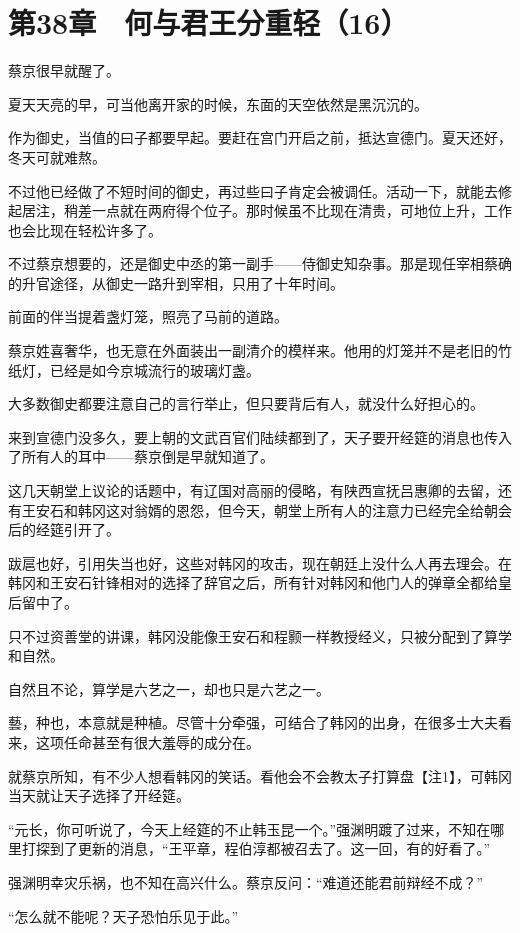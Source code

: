 \section{第38章　何与君王分重轻（16）}

蔡京很早就醒了。

夏天天亮的早，可当他离开家的时候，东面的天空依然是黑沉沉的。

作为御史，当值的曰子都要早起。要赶在宫门开启之前，抵达宣德门。夏天还好，冬天可就难熬。

不过他已经做了不短时间的御史，再过些曰子肯定会被调任。活动一下，就能去修起居注，稍差一点就在两府得个位子。那时候虽不比现在清贵，可地位上升，工作也会比现在轻松许多了。

不过蔡京想要的，还是御史中丞的第一副手——侍御史知杂事。那是现任宰相蔡确的升官途径，从御史一路升到宰相，只用了十年时间。

前面的伴当提着盏灯笼，照亮了马前的道路。

蔡京姓喜奢华，也无意在外面装出一副清介的模样来。他用的灯笼并不是老旧的竹纸灯，已经是如今京城流行的玻璃灯盏。

大多数御史都要注意自己的言行举止，但只要背后有人，就没什么好担心的。

来到宣德门没多久，要上朝的文武百官们陆续都到了，天子要开经筵的消息也传入了所有人的耳中——蔡京倒是早就知道了。

这几天朝堂上议论的话题中，有辽国对高丽的侵略，有陕西宣抚吕惠卿的去留，还有王安石和韩冈这对翁婿的恩怨，但今天，朝堂上所有人的注意力已经完全给朝会后的经筵引开了。

跋扈也好，引用失当也好，这些对韩冈的攻击，现在朝廷上没什么人再去理会。在韩冈和王安石针锋相对的选择了辞官之后，所有针对韩冈和他门人的弹章全都给皇后留中了。

只不过资善堂的讲课，韩冈没能像王安石和程颢一样教授经义，只被分配到了算学和自然。

自然且不论，算学是六艺之一，却也只是六艺之一。

藝，种也，本意就是种植。尽管十分牵强，可结合了韩冈的出身，在很多士大夫看来，这项任命甚至有很大羞辱的成分在。

就蔡京所知，有不少人想看韩冈的笑话。看他会不会教太子打算盘【注1】，可韩冈当天就让天子选择了开经筵。

“元长，你可听说了，今天上经筵的不止韩玉昆一个。”强渊明踱了过来，不知在哪里打探到了更新的消息，“王平章，程伯淳都被召去了。这一回，有的好看了。”

强渊明幸灾乐祸，也不知在高兴什么。蔡京反问：“难道还能君前辩经不成？”

“怎么就不能呢？天子恐怕乐见于此。”

